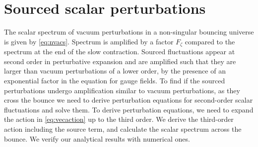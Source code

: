 \documentclass[12pt,a4paper]{article}
\numberwithin{equation}{section}
\numberwithin{equation}{section}
\begin{document}
\section{Sourced scalar perturbations}
\label{sec:scalar}
The scalar spectrum of vacuum perturbations in a non-singular bouncing universe is given by \eqref{eq:nvacs}. Spectrum is amplified by  a factor $F_{\zeta}$ compared to the spectrum at the end of the slow contraction. Sourced fluctuations appear at second order in perturbative expansion and are amplified such that they are larger than vacuum perturbations of a lower order, by the presence of an exponential factor in the equation for gauge fields. To find if the sourced perturbations undergo amplification similar to vacuum perturbations, as they cross the bounce we need to derive perturbation equations for second-order scalar fluctuations and solve them. To derive perturbation equations, we need to expand the action in \eqref{eq:vecaction} up to the third order. We derive the third-order action including the source term, and calculate the scalar spectrum across the bounce. We verify our analytical results with numerical ones.
\end{document}
